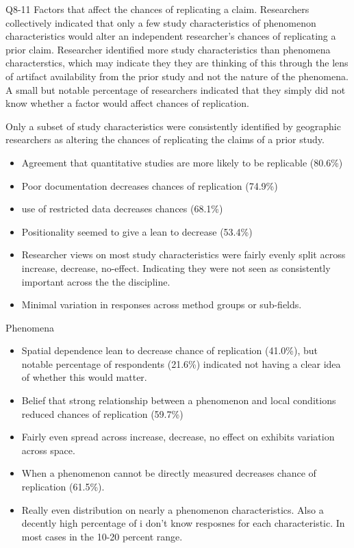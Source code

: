 \documentclass[]{interact}
\theoremstyle{plain}%
\theoremstyle{definition}
\theoremstyle{remark}
\begin{document}
Q8-11 Factors that affect the chances of replicating a claim.
Researchers collectively indicated that only a few study characteristics of phenomenon characteristics would alter an independent researcher's chances of replicating a prior claim. 
Researcher identified more study characteristics than phenomena characterstics, which may indicate they they are thinking of this through the lens of artifact availability from the prior study and not the nature of the phenomena. 
A small but notable percentage of researchers indicated that they simply did not know whether a factor would affect chances of replication. 


Only a subset of study characteristics were consistently identified by geographic researchers as altering the chances of replicating the claims of a prior study.
\begin{itemize}
    \item Agreement that quantitative studies are more likely to be replicable (80.6\%)
    \item Poor documentation decreases chances of replication (74.9\%)
    \item use of restricted data decreases chances (68.1\%)
    \item Positionality seemed to give a lean to decrease (53.4\%)
    \item Researcher views on most study characteristics were fairly evenly split across increase, decrease, no-effect. Indicating they were not seen as consistently important across the the discipline. 
    \item Minimal variation in responses across method groups or sub-fields. 
\end{itemize}

Phenomena
\begin{itemize}
    \item Spatial dependence lean to decrease chance of replication (41.0\%), but notable percentage of respondents (21.6\%) indicated not having a clear idea of whether this would matter.
    \item Belief that strong relationship between a phenomenon and local conditions reduced chances of replication (59.7\%)
    \item Fairly even spread across increase, decrease, no effect on exhibits variation across space.
    \item When a phenomenon cannot be directly measured decreases chance of replication (61.5\%).
    \item Really even distribution on nearly a phenomenon characteristics. Also a decently high percentage of i don't know resposnes for each characteristic. In most cases in the 10-20 percent range. 
\end{itemize}
\end{document}
